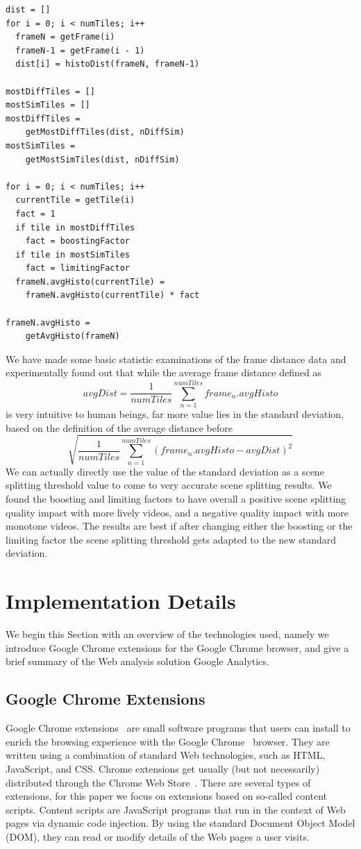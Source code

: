 \documentclass[10pt,twocolumn,letterpaper]{article}
\begin{document}
\begin{lstlisting}[caption=Pseudocode for our scene detection algorithm., label=code:algorithm, float=t, frame=single]
dist = []
for i = 0; i < numTiles; i++
  frameN = getFrame(i)
  frameN-1 = getFrame(i - 1)
  dist[i] = histoDist(frameN, frameN-1)
  
mostDiffTiles = []
mostSimTiles = []
mostDiffTiles =
    getMostDiffTiles(dist, nDiffSim)
mostSimTiles =
    getMostSimTiles(dist, nDiffSim)

for i = 0; i < numTiles; i++
  currentTile = getTile(i)
  fact = 1
  if tile in mostDiffTiles
    fact = boostingFactor
  if tile in mostSimTiles
    fact = limitingFactor
  frameN.avgHisto(currentTile) =
    frameN.avgHisto(currentTile) * fact
    
frameN.avgHisto =
    getAvgHisto(frameN)    
\end{lstlisting}

We have made some basic statistic examinations of the frame distance data and experimentally found out that while the average frame distance defined as $$avgDist = \frac{1}{numTiles}\sum_{n=1}^{numTiles}frame_{n}.avgHisto$$ is very intuitive to human beings, far more value lies in the standard deviation, based on the definition of the average distance before $$\sqrt{\frac{1}{numTiles}\sum_{n=1}^{numTiles}(frame_{n}.avgHisto - avgDist)^{2}}$$ We can actually directly use the value of the standard deviation as a scene splitting threshold value to come to very accurate scene splitting results. We found the boosting and limiting factors to have overall a positive scene splitting quality impact with more lively videos, and a negative quality impact with more monotone videos. The results are best if after changing either the boosting or the limiting factor the scene splitting threshold gets adapted to the new standard deviation.

\section{Implementation Details} \label{sec:implementation}
We begin this Section with an overview of the technologies used, namely we introduce Google Chrome extensions for the Google Chrome browser, and give a brief summary of the Web analysis solution Google Analytics.

\subsection{Google Chrome Extensions}
Google Chrome extensions~\cite{chromeextensions} are small software programs that users can install to enrich the browsing experience with the Google Chrome~\cite{chrome} browser. They are written using a combination of standard Web technologies, such as HTML, JavaScript, and CSS. Chrome extensions get usually (but not necessarily) distributed through the Chrome Web Store~\cite{chromewebstore}. There are several types of extensions, for this paper we focus on extensions based on so-called content scripts. Content scripts are JavaScript programs that run in the context of Web pages via dynamic code injection. By using the standard Document Object Model (DOM), they can read or modify details of the Web pages a user visits.
\end{document}
